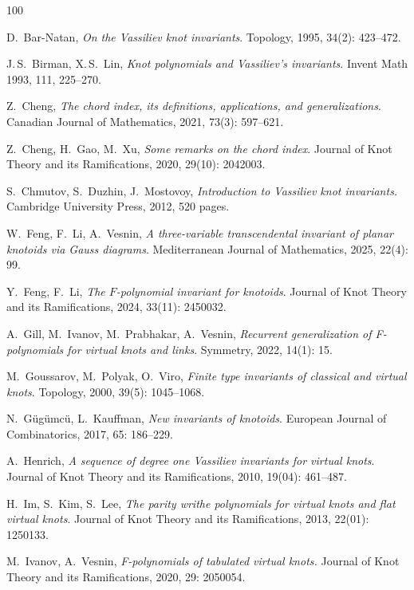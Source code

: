 \documentclass[11pt]{amsart}
\theoremstyle{noparens}
\numberwithin{equation}{section}
\numberwithin{equation}{section}
\begin{document}
\begin{thebibliography}{100}

D.~Bar-Natan, \textit{On the Vassiliev knot invariants}. Topology, 1995, 34(2): 423--472.

J.\,S.~Birman, X.\,S.~Lin, \textit{Knot polynomials and Vassiliev's invariants}. Invent Math 1993, 111, 225--270.
	
Z.~Cheng, \textit{The chord index, its definitions, applications, and generalizations}. Canadian Journal of Mathematics, 2021, 73(3): 597--621.

Z.~Cheng, H.~Gao, M.~Xu, \textit{Some remarks on the chord index}. Journal of Knot Theory and its Ramifications, 2020, 29(10): 2042003.	

S.~Chmutov, S.~Duzhin, J.~Mostovoy, \textit{Introduction to Vassiliev knot invariants.} Cambridge University Press, 2012, 520 pages.

W.~Feng, F.~Li, A.~Vesnin, \textit{A three-variable transcendental invariant of planar knotoids via Gauss diagrams}. Mediterranean Journal of Mathematics, 2025, 22(4): 99.

Y.~Feng, F.~Li, \textit{The $F$-polynomial invariant for knotoids}. Journal of Knot Theory and its Ramifications, 2024, 33(11): 2450032.	

A.~Gill, M.~Ivanov, M.~Prabhakar, A.~Vesnin, \textit{Recurrent generalization of F-polynomials for virtual knots and links}. Symmetry, 2022, 14(1): 15.

M.~Goussarov, M.~Polyak, O.~Viro, \textit{Finite type invariants of classical and virtual knots}. Topology, 2000, 39(5): 1045--1068.


N.~G\"{u}g\"{u}mc\"{u}, L.~Kauffman, \textit{New invariants of knotoids}. European Journal of Combinatorics, 2017, 65: 186--229.

A.~Henrich, \textit{A sequence of degree one Vassiliev invariants for virtual knots}. Journal of Knot Theory and its Ramifications, 2010, 19(04): 461--487.

H.~Im, S.~Kim, S.~Lee, \textit{The parity writhe polynomials for virtual knots and flat virtual knots}. Journal of Knot Theory and its Ramifications, 2013, 22(01): 1250133.

M.~Ivanov, A.~Vesnin, \textit{F-polynomials of tabulated virtual knots.} Journal of Knot Theory and its Ramifications,  2020, 29: 2050054.


\end{thebibliography}
\end{document}
